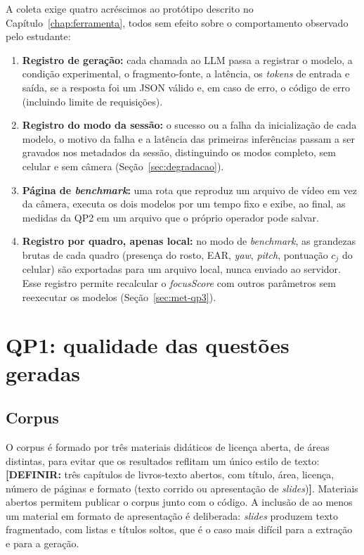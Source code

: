 \documentclass[portuguese,oneside]{tcc}
\newcommand{\estr}[1]{\emph{#1}}
\newcommand{\fs}{\emph{focusScore}\xspace}
\newcommand{\definir}[1]{\textcolor{orange!75!black}{\textbf{[DEFINIR:} #1\textbf{]}}}
\begin{document}
A coleta exige quatro acréscimos ao protótipo descrito no Capítulo~\ref{chap:ferramenta}, todos sem efeito sobre o comportamento observado pelo estudante:

\begin{enumerate}
  \item \textbf{Registro de geração:} cada chamada ao LLM passa a registrar o modelo, a condição experimental, o fragmento-fonte, a latência, os \estr{tokens} de entrada e saída, se a resposta foi um JSON válido e, em caso de erro, o código de erro (incluindo limite de requisições).
  \item \textbf{Registro do modo da sessão:} o sucesso ou a falha da inicialização de cada modelo, o motivo da falha e a latência das primeiras inferências passam a ser gravados nos metadados da sessão, distinguindo os modos completo, sem celular e sem câmera (Seção~\ref{sec:degradacao}).
  \item \textbf{Página de \estr{benchmark}:} uma rota que reproduz um arquivo de vídeo em vez da câmera, executa os dois modelos por um tempo fixo e exibe, ao final, as medidas da QP2 em um arquivo que o próprio operador pode salvar.
  \item \textbf{Registro por quadro, apenas local:} no modo de \estr{benchmark}, as grandezas brutas de cada quadro (presença do rosto, EAR, \estr{yaw}, \estr{pitch}, pontuação $c_j$ do celular) são exportadas para um arquivo local, nunca enviado ao servidor. Esse registro permite recalcular o \fs com outros parâmetros sem reexecutar os modelos (Seção~\ref{sec:met-qp3}).
\end{enumerate}

\section{\label{sec:met-qp1}QP1: qualidade das questões geradas}

\subsection{Corpus}

O corpus é formado por três materiais didáticos de licença aberta, de áreas distintas, para evitar que os resultados reflitam um único estilo de texto: \definir{três capítulos de livros-texto abertos, com título, área, licença, número de páginas e formato (texto corrido ou apresentação de \estr{slides})}. Materiais abertos permitem publicar o corpus junto com o código. A inclusão de ao menos um material em formato de apresentação é deliberada: \estr{slides} produzem texto fragmentado, com listas e títulos soltos, que é o caso mais difícil para a extração e para a geração.
\end{document}
